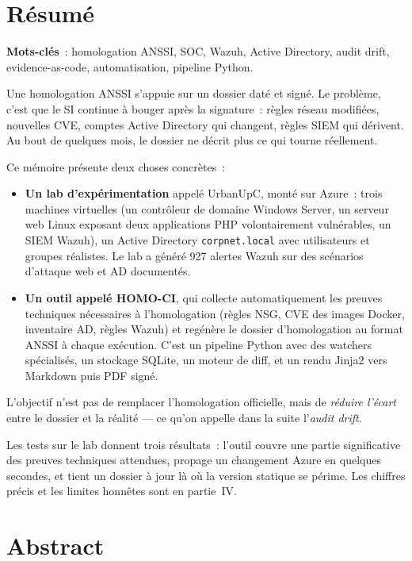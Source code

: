 \chapter*{Résumé}

\textbf{Mots-clés}~: homologation ANSSI, SOC, Wazuh, Active
Directory, audit drift, evidence-as-code, automatisation,
pipeline Python.

\bigskip

Une homologation ANSSI s'appuie sur un dossier daté et signé. Le
problème, c'est que le SI continue à bouger après la signature~:
règles réseau modifiées, nouvelles CVE, comptes Active Directory
qui changent, règles SIEM qui dérivent. Au bout de quelques mois,
le dossier ne décrit plus ce qui tourne réellement.

Ce mémoire présente deux choses concrètes~:

\begin{itemize}
\item \textbf{Un lab d'expérimentation} appelé UrbanUpC, monté sur
  Azure~: trois machines virtuelles (un contrôleur de domaine
  Windows Server, un serveur web Linux exposant deux applications
  PHP volontairement vulnérables, un SIEM Wazuh), un Active
  Directory \texttt{corpnet.local} avec utilisateurs et groupes
  réalistes. Le lab a généré 927 alertes Wazuh sur des scénarios
  d'attaque web et AD documentés.

\item \textbf{Un outil appelé HOMO-CI}, qui collecte automatiquement
  les preuves techniques nécessaires à l'homologation (règles
  NSG, CVE des images Docker, inventaire AD, règles Wazuh) et
  regénère le dossier d'homologation au format ANSSI à chaque
  exécution. C'est un pipeline Python avec des watchers
  spécialisés, un stockage SQLite, un moteur de diff, et un
  rendu Jinja2 vers Markdown puis PDF signé.
\end{itemize}

L'objectif n'est pas de remplacer l'homologation officielle, mais
de \emph{réduire l'écart} entre le dossier et la réalité --- ce
qu'on appelle dans la suite l'\emph{audit drift}.

Les tests sur le lab donnent trois résultats~: l'outil couvre une
partie significative des preuves techniques attendues, propage un
changement Azure en quelques secondes, et tient un dossier à jour
là où la version statique se périme. Les chiffres précis et les
limites honnêtes sont en partie~IV.

\chapter*{Abstract}

